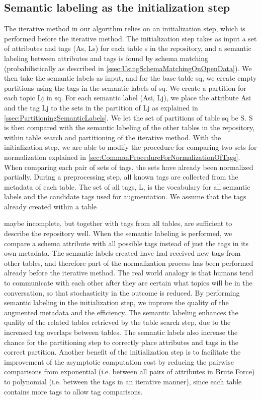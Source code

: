 \subsection{Semantic labeling as the initialization step}
\label{ssec:SemanticLabelingAsTheInitializationStep}

The iterative method in our algorithm relies on an initialization step, which is performed before the iterative method. The initialization step takes as input a set of attributes and tags (As, Ls) for each table s in the repository, and a semantic labeling between attributes and tags is found by schema matching (probabilistically as described in \autoref{ssec:UsingSchemaMatchingOnOpenData}). We then take the semantic labels as input, and for the base table sq, we create empty partitions using the tags in the semantic labels of sq. We create a partition for each topic Lj in sq. For each semantic label (Asi, Lj), we place the attribute Asi and the tag Lj to the sets in the partition of Lj as explained in \autoref{ssec:PartitioningSemanticLabels}. We let the set of partitions of table sq be S. S is then compared with the semantic labeling of the other tables in the repository, within table search and partitioning of the iterative method.
With the initialization step, we are able to modify the procedure for comparing two sets for normalization explained in \autoref{sec:CommonProcedureForNormalizationOfTags}. When comparing each pair of sets of tags, the sets have already been normalized partially. During a preprocessing step, all known tags are collected from the metadata of each table. The set of all tags, L, is the vocabulary for all semantic labels and the candidate tags used for augmentation. We assume that the tags already created within a table

maybe incomplete, but together with tags from all tables, are sufficient to describe the repository well. When the semantic labeling is performed, we compare a schema attribute with all possible tags instead of just the tags in its own metadata. The semantic labels created have had received new tags from other tables, and therefore part of the normalization process has been performed already before the iterative method. The real world analogy is that humans tend to communicate with each other after they are certain what topics will be in the conversation, so that stochasticity in the outcome is reduced.
By performing semantic labeling in the initialization step, we improve the quality of the augmented metadata and the efficiency. The semantic labeling enhances the quality of the related tables retrieved by the table search step, due to the increased tag overlaps between tables. The semantic labels also increase the chance for the partitioning step to correctly place attributes and tags in the correct partition. Another benefit of the initialization step is to facilitate the improvement of the asymptotic computation cost by reducing the pairwise comparisons from exponential (i.e. between all pairs of attributes in Brute Force) to polynomial (i.e. between the tags in an iterative manner), since each table contains more tags to allow tag comparisons.

